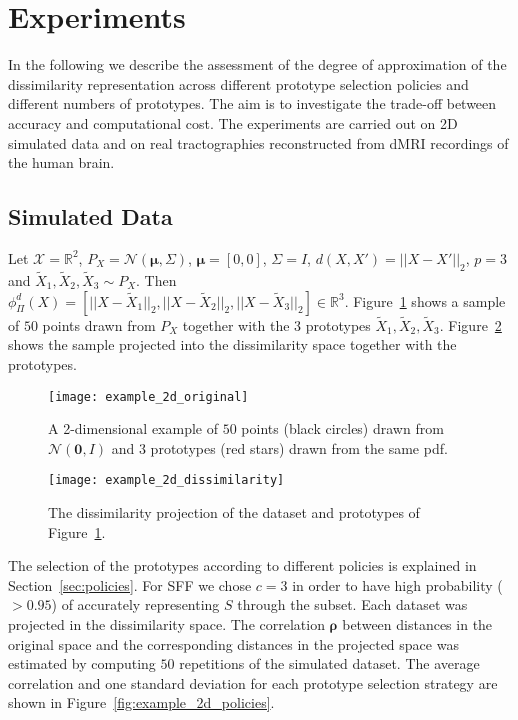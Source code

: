 \section{Experiments}
\label{sec:experiments}

In the following we describe the assessment of the degree of
approximation of the dissimilarity representation across different
prototype selection policies and different numbers of prototypes. The
aim is to investigate the trade-off between accuracy and computational
cost. The experiments are carried out on 2D simulated data and on real
tractographies reconstructed from dMRI recordings of the human brain.

\subsection{Simulated Data}
\label{sec:experiments_simulated_data}
Let $\mathcal{X} = \mathbb{R}^2$, $P_X = \mathcal{N}(\boldsymbol{\mu},
\Sigma)$, $\boldsymbol{\mu} = [0,0]$, $\Sigma = I$,
$d(X,X')=||X-X'||_2$, $p=3$ and $\tilde{X}_1, \tilde{X}_2, \tilde{X}_3
\sim P_X$. Then $\phi_{\Pi}^d(X) = \left[ ||X-\tilde{X}_1||_2,
  ||X-\tilde{X}_2||_2, ||X-\tilde{X}_3||_2 \right] \in
\mathbb{R}^3$. Figure~\ref{fig:toy_example_2d} shows a sample of $50$
points drawn from $P_X$ together with the $3$ prototypes $\tilde{X}_1,
\tilde{X}_2, \tilde{X}_3$. Figure~\ref{fig:toy_example_2d_projected}
shows the sample projected into the dissimilarity space together
with the prototypes. 

\begin{figure}
  \centering
  \texttt{[image: example\_2d\_original]}
  \caption{A 2-dimensional example of $50$ points (black circles)
    drawn from $\mathcal{N}(\boldsymbol{0},I)$ and $3$
    prototypes (red stars) drawn from the same pdf.}
  \label{fig:toy_example_2d}
\end{figure}

\begin{figure}
  \centering
  \texttt{[image: example\_2d\_dissimilarity]}
  \caption{The dissimilarity projection of the dataset and prototypes
    of Figure~\ref{fig:toy_example_2d}.}
  \label{fig:toy_example_2d_projected}
\end{figure}

The selection of the prototypes according to different policies is
explained in Section~\ref{sec:policies}. For SFF we chose $c = 3$ in
order to have high probability ($>0.95$) of accurately representing $S$ through
the subset. Each dataset was projected in the dissimilarity space. The
correlation $\boldsymbol{\rho}$ between distances in the original
space and the corresponding distances in the projected space was
estimated by computing $50$ repetitions of the simulated dataset. The
average correlation and one standard deviation for each prototype
selection strategy are shown in Figure~\ref{fig:example_2d_policies}.

